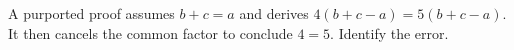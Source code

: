 A purported proof assumes $b+c=a$ and derives $4(b+c-a)=5(b+c-a)$. It then cancels the common factor to conclude $4=5$. Identify the error.
